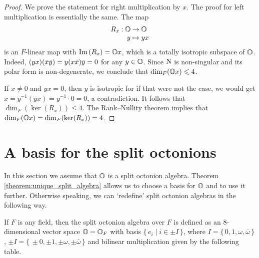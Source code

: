 \begin{proof}
	We prove the statement for right multiplication by $x$. The proof
	for left multiplication is essentially the same. The map
	\begin{equation*}
		\begin{array}{r@{\;}c@{\;}l}
			R_x : \O & \rightarrow & \O \\
			y & \mapsto & yx
		\end{array}
	\end{equation*}
	is an $F$-linear map with $\mathrm{Im}\,(R_x) = \mathbb{O} x$, which is a totally isotropic
	subspace of $\mathbb{O}$. Indeed, $(yx)(\ovx \ovy) = y(x\ovx)\ovy = 0$ for any
	$y \in \mathbb{O}$. Since $\mathord{\mathrm{N}}$ is non-singular and its polar form is non-degenerate,
	we conclude that $\dim_F(\mathbb{O} x) \leqslant 4$.
	
	If $x \neq 0$ and $yx = 0$, then $y$ is isotropic for if that were not 
	the case, we would get $x = y^{-1}(yx) = y^{-1}\cdot 0 = 0$,
	a contradiction. It follows that \mbox{$\dim_F(\ker(R_x)) \leqslant 4$}.
	The Rank--Nullity theorem implies that \mbox{$\dim_F(\mathbb{O} x) = \dim_F(\operatorname{ker}(R_x)) = 4$}. 
\end{proof}

\section{A basis for the split octonions}
\label{section:split_basis}

In this section we assume that $\mathbb{O}$ is a split octonion algebra. 
Theorem \ref{theorem:unique_split_algebra} 
allows us to choose a basis for $\mathbb{O}$ and to use it further.
Otherwise speaking, we can `redefine' split octonion algebras in the following way. 

\begin{definition}
	\label{def:split_octonions}
	If $F$ is any field, then the split octonion algebra over $F$ is defined as an
	$8$-dimensional vector space $\mathbb{O} = \mathbb{O}_F$ with basis $\{\,e_i \mid i \in \pm I\,\}$,
	where $I = \{\,0,1,\omega,\bar{\omega}\,\}$, $\pm I = \{\,\pm 0, \pm 1, \pm \omega,
	\pm \bar{\omega}\,\}$ and bilinear multiplication given by the following table.
\end{definition}

